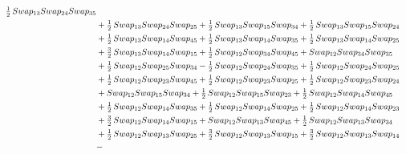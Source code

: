 \documentclass[10pt,a4paper]{amsart}
\begin{document}
\begin{align*}
        \tfrac12\,\textnormal{Swap}_{13} \textnormal{Swap}_{24} \textnormal{Swap}_{35}\\ & + \tfrac12\,\textnormal{Swap}_{13} \textnormal{Swap}_{24} \textnormal{Swap}_{25} + \tfrac12\,\textnormal{Swap}_{13} \textnormal{Swap}_{15} \textnormal{Swap}_{34} + \tfrac12\,\textnormal{Swap}_{13} \textnormal{Swap}_{15} \textnormal{Swap}_{24}\\ & +
        \tfrac12\,\textnormal{Swap}_{13} \textnormal{Swap}_{14} \textnormal{Swap}_{45} + \tfrac12\,\textnormal{Swap}_{13} \textnormal{Swap}_{14} \textnormal{Swap}_{35} + \tfrac12\,\textnormal{Swap}_{13} \textnormal{Swap}_{14} \textnormal{Swap}_{25}\\ & + \tfrac32\,\textnormal{Swap}_{13} \textnormal{Swap}_{14} \textnormal{Swap}_{15} +
        \tfrac12\,\textnormal{Swap}_{12} \textnormal{Swap}_{34} \textnormal{Swap}_{45} + \textnormal{Swap}_{12} \textnormal{Swap}_{34} \textnormal{Swap}_{35}\\ & + \tfrac12\,\textnormal{Swap}_{12} \textnormal{Swap}_{25} \textnormal{Swap}_{34} - \tfrac12\,\textnormal{Swap}_{12} \textnormal{Swap}_{24} \textnormal{Swap}_{35} +
        \tfrac12\,\textnormal{Swap}_{12} \textnormal{Swap}_{24} \textnormal{Swap}_{25}\\ & + \tfrac12\,\textnormal{Swap}_{12} \textnormal{Swap}_{23} \textnormal{Swap}_{45} + \tfrac12\,\textnormal{Swap}_{12} \textnormal{Swap}_{23} \textnormal{Swap}_{25} + \tfrac12\,\textnormal{Swap}_{12} \textnormal{Swap}_{23} \textnormal{Swap}_{24}\\ & +
        \textnormal{Swap}_{12} \textnormal{Swap}_{15} \textnormal{Swap}_{34} + \tfrac12\,\textnormal{Swap}_{12} \textnormal{Swap}_{15} \textnormal{Swap}_{23} + \tfrac12\,\textnormal{Swap}_{12} \textnormal{Swap}_{14} \textnormal{Swap}_{45}\\ & + \tfrac12\,\textnormal{Swap}_{12} \textnormal{Swap}_{14} \textnormal{Swap}_{35} +
        \tfrac12\,\textnormal{Swap}_{12} \textnormal{Swap}_{14} \textnormal{Swap}_{25} + \tfrac12\,\textnormal{Swap}_{12} \textnormal{Swap}_{14} \textnormal{Swap}_{23}\\ & + \tfrac32\,\textnormal{Swap}_{12} \textnormal{Swap}_{14} \textnormal{Swap}_{15} + \textnormal{Swap}_{12} \textnormal{Swap}_{13} \textnormal{Swap}_{45} +
        \tfrac12\,\textnormal{Swap}_{12} \textnormal{Swap}_{13} \textnormal{Swap}_{34}\\ & + \tfrac12\,\textnormal{Swap}_{12} \textnormal{Swap}_{13} \textnormal{Swap}_{25} + \tfrac32\,\textnormal{Swap}_{12} \textnormal{Swap}_{13} \textnormal{Swap}_{15} + \tfrac32\,\textnormal{Swap}_{12} \textnormal{Swap}_{13} \textnormal{Swap}_{14}\\ & -

\end{align*}
\end{document}
